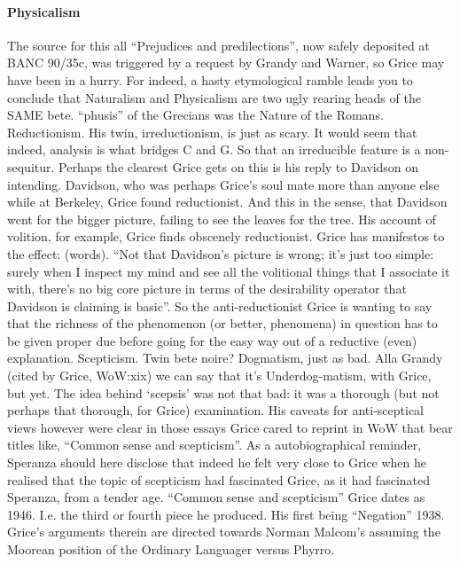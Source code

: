 \documentclass[10pt,titlepage]{book}
\begin{document}
{\paragraph{Physicalism}

The  source for this all “Prejudices and predilections”, now 
safely deposited at BANC  90/35c, was triggered by a request by Grandy and 
Warner, so Grice may have been  in a hurry. For indeed, a hasty etymological 
ramble leads you to conclude that  Naturalism and Physicalism are two ugly 
rearing heads of the SAME bete. “phusis”  of the Grecians was the Nature of 
the Romans.   
Reductionism. His  twin, irreductionism, is just as scary. It would seem 
that indeed, analysis is  what bridges C and G. So that an irreducible feature 
is a non-sequitur.  Perhaps the clearest Grice gets on this  is his reply 
to Davidson on intending. Davidson, who was perhaps Grice’s soul  mate more 
than anyone else while at Berkeley, Grice found reductionist. And this  in 
the sense, that Davidson went for the bigger picture, failing to see the  
leaves for the tree. His account of volition, for example, Grice finds obscenely 
 reductionist. Grice has manifestos to the effect: (words). “Not that 
Davidson’s  picture is wrong; it’s just too simple: surely when I inspect my 
mind and see  all the volitional things that I associate it with, there’s no 
big core picture  in terms of the desirability operator that Davidson is 
claiming is basic”. So  the anti-reductionist Grice is wanting to say that the 
richness of the  phenomenon (or better,  phenomena)  in question has to be 
given proper due before going for the easy way out of a  reductive (even) 
explanation. 
Scepticism. Twin  bete noire? Dogmatism, just as bad. Alla Grandy (cited by 
Grice, WoW:xix) we can  say that it’s Underdog-matism, with Grice, but yet. 
The idea behind ‘scepsis’  was not that bad: it was a thorough (but not 
perhaps that thorough, for Grice)  examination. His caveats for anti-sceptical 
views however were clear in those  essays Grice cared to reprint in WoW 
that bear titles like, “Common sense and  scepticism”. As a autobiographical 
reminder, Speranza should here disclose that  indeed he felt very close to 
Grice when he realised that the topic of scepticism  had fascinated Grice, as 
it had fascinated Speranza, from a tender age. “Common  sense and scepticism”
 Grice dates as 1946. I.e. the third or fourth piece he  produced. His 
first being “Negation” 1938. Grice’s arguments therein are  directed towards 
Norman Malcom’s assuming the Moorean position of the Ordinary  Languager 
versus Phyrro. 

}
\end{document}
